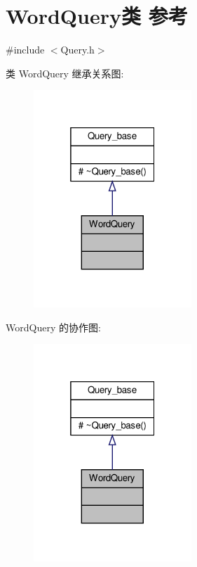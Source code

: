 \hypertarget{classWordQuery}{}\section{Word\+Query类 参考}
\label{classWordQuery}


{\ttfamily \#include $<$Query.\+h$>$}



类 Word\+Query 继承关系图\+:\nopagebreak
\begin{figure}[H]
\begin{center}
\leavevmode
\includegraphics[width=169pt]{classWordQuery__inherit__graph}
\end{center}
\end{figure}


Word\+Query 的协作图\+:\nopagebreak
\begin{figure}[H]
\begin{center}
\leavevmode
\includegraphics[width=169pt]{classWordQuery__coll__graph}
\end{center}
\end{figure}
